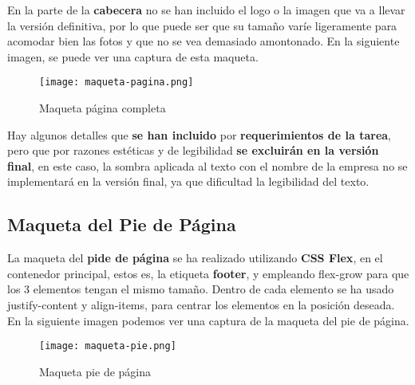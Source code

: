 En la parte de la \textbf{cabecera} no se han incluido el logo o la imagen que va a llevar la versión definitiva, por lo que puede ser que su tamaño varíe ligeramente para acomodar bien las fotos y que no se vea demasiado amontonado. En la siguiente imagen, se puede ver una captura de esta maqueta.

\begin{figure}[H]
    \centering
    \texttt{[image: maqueta-pagina.png]}
    \caption{Maqueta página completa}
\end{figure}

Hay algunos detalles que \textbf{se han incluido} por \textbf{requerimientos de la tarea}, pero que por razones estéticas y de legibilidad \textbf{se excluirán en la versión final}, en este caso, la sombra aplicada al texto con el nombre de la empresa no se implementará en la versión final, ya que dificultad la legibilidad del texto.

\subsection{Maqueta del Pie de Página}
La maqueta del \textbf{pide de página} se ha realizado utilizando  \textbf{CSS Flex}, en el contenedor principal, estos es, la etiqueta \textbf{footer}, y empleando flex-grow para que los 3 elementos tengan el mismo tamaño. Dentro de cada elemento se ha usado justify-content y align-items, para centrar los elementos en la posición deseada. En la siguiente imagen podemos ver una captura de la maqueta del pie de página.

\begin{figure}[H]
    \centering
    \texttt{[image: maqueta-pie.png]}
    \caption{Maqueta pie de página}
\end{figure}






%
%

